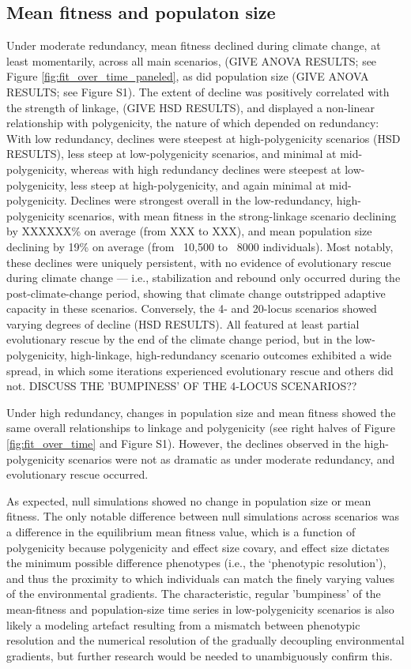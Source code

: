 \documentclass[9pt,twocolumn,twoside,lineno]{pnas-new}
\begin{document}
\subsection*{Mean fitness and populaton size}
Under moderate redundancy, mean fitness declined during climate change, at least momentarily, across all main scenarios, (GIVE ANOVA 
RESULTS; see Figure \ref{fig:fit_over_time_paneled}, as did population size (GIVE ANOVA 
RESULTS; see Figure S1). The extent of decline was 
positively correlated with the strength of linkage, (GIVE HSD RESULTS), and 
displayed a non-linear relationship with polygenicity, the nature of which depended on redundancy:
With low redundancy, declines were steepest at high-polygenicity
scenarios (HSD RESULTS), less steep at low-polygenicity scenarios, and minimal at
mid-polygenicity, whereas with high redundancy declines were steepest at
low-polygenicity, less steep at high-polygenicity, and again minimal at mid-polygenicity.
Declines were strongest overall in the low-redundancy, high-polygenicity scenarios,
with mean fitness in the strong-linkage scenario 
declining by XXXXXX\% on average (from XXX to XXX),
and mean population size declining by 19\% on average (from ~10,500 to ~8000 individuals).
Most notably, these declines were uniquely persistent,
with no evidence of evolutionary rescue during climate change --- i.e., stabilization and rebound only occurred during the post-climate-change period,  showing that climate change outstripped adaptive capacity in these scenarios.
Conversely, the 4- and 20-locus scenarios showed varying degrees
of decline (HSD RESULTS).
All featured at least partial evolutionary rescue by the end of the climate change period,
but in the low-polygenicity, high-linkage, high-redundancy scenario outcomes exhibited
a wide spread, in which some iterations experienced evolutionary rescue and others did not.
 DISCUSS THE 'BUMPINESS' OF THE 4-LOCUS SCENARIOS?? 

Under high redundancy, changes in population size and mean fitness showed
the same overall relationships to linkage and polygenicity (see right halves of Figure \ref{fig:fit_over_time} and Figure S1).
However, the declines observed in the high-polygenicity scenarios were not as dramatic as
under moderate redundancy, and evolutionary rescue occurred.

As expected, null simulations showed no change in population size or mean fitness.
The only notable difference between null simulations across scenarios was a difference in the 
equilibrium mean fitness value, which is a function of polygenicity because polygenicity 
and effect size covary, and effect size dictates the minimum possible difference phenotypes
(i.e., the `phenotypic resolution'), and thus the proximity to which individuals can 
match the finely varying values of the environmental gradients.
The characteristic, regular 'bumpiness' of the mean-fitness and population-size
time series in low-polygenicity scenarios is also likely a modeling artefact
resulting from a mismatch between phenotypic resolution
and the numerical resolution of the gradually decoupling environmental gradients,
but further research would be needed to unambiguously confirm this.
\end{document}
